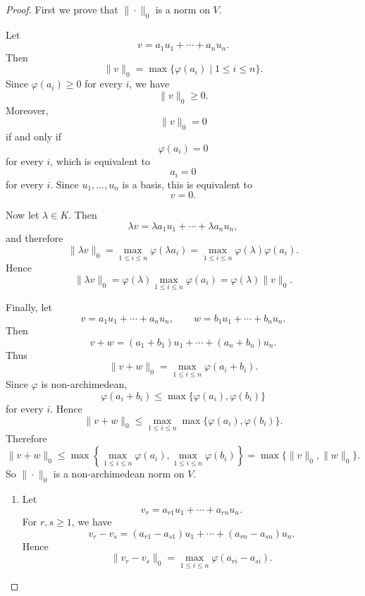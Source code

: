     \begin{proof}
        First we prove that $\|\cdot\|_0$ is a norm on $V$.
        
        Let
        \[
            v=a_1u_1+\cdots+a_nu_n.
        \]
        Then
        \[
            \|v\|_0=\max\{\varphi(a_i)\mid 1\leq i\leq n\}.
        \]
        Since $\varphi(a_i)\geq 0$ for every $i$, we have
        \[
            \|v\|_0\geq 0.
        \]
        Moreover,
        \[
            \|v\|_0=0
        \]
        if and only if
        \[
            \varphi(a_i)=0
        \]
        for every $i$, which is equivalent to
        \[
            a_i=0
        \]
        for every $i$. Since $u_1,\dots,u_n$ is a basis, this is equivalent to
        \[
            v=0.
        \]
        
        Now let $\lambda\in K$. Then
        \[
            \lambda v
            =
            \lambda a_1u_1+\cdots+\lambda a_nu_n,
        \]
        and therefore
        \[
            \|\lambda v\|_0
            =
            \max_{1\leq i\leq n}\varphi(\lambda a_i)
            =
            \max_{1\leq i\leq n}\varphi(\lambda)\varphi(a_i).
        \]
        Hence
        \[
            \|\lambda v\|_0
            =
            \varphi(\lambda)\max_{1\leq i\leq n}\varphi(a_i)
            =
            \varphi(\lambda)\|v\|_0.
        \]
        
        Finally, let
        \[
            v=a_1u_1+\cdots+a_nu_n,
            \qquad
            w=b_1u_1+\cdots+b_nu_n.
        \]
        Then
        \[
            v+w=(a_1+b_1)u_1+\cdots+(a_n+b_n)u_n.
        \]
        Thus
        \[
            \|v+w\|_0
            =
            \max_{1\leq i\leq n}\varphi(a_i+b_i).
        \]
        Since $\varphi$ is non-archimedean,
        \[
            \varphi(a_i+b_i)\leq \max\{\varphi(a_i),\varphi(b_i)\}
        \]
        for every $i$. Hence
        \[
            \|v+w\|_0
            \leq
            \max_{1\leq i\leq n}\max\{\varphi(a_i),\varphi(b_i)\}.
        \]
        Therefore
        \[
            \|v+w\|_0
            \leq
            \max\left\{
                \max_{1\leq i\leq n}\varphi(a_i),
                \max_{1\leq i\leq n}\varphi(b_i)
            \right\}
            =
            \max\{\|v\|_0,\|w\|_0\}.
        \]
        So $\|\cdot\|_0$ is a non-archimedean norm on $V$.
        
        \begin{enumerate}
            \item Let
            \[
                v_r=a_{r1}u_1+\cdots+a_{rn}u_n.
            \]
            For $r,s\geq 1$, we have
            \[
                v_r-v_s
                =
                (a_{r1}-a_{s1})u_1+\cdots+(a_{rn}-a_{sn})u_n.
            \]
            Hence
            \[
                \|v_r-v_s\|_0
                =
                \max_{1\leq i\leq n}\varphi(a_{ri}-a_{si}).
            \]
        

\end{enumerate}
\end{proof}
